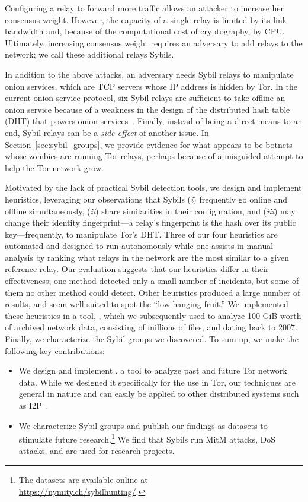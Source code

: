 Configuring a relay to forward more traffic allows an attacker to increase her
consensus weight.  However, the capacity of a single relay is limited by its
link bandwidth and, because of the computational cost of cryptography, by CPU.
Ultimately, increasing consensus weight requires an adversary to add relays to
the network; we call these additional relays Sybils.

In addition to the above attacks, an adversary needs Sybil relays to manipulate
onion services, which are TCP servers whose IP address is hidden by Tor.  In the
current onion service protocol, six Sybil relays are sufficient to take offline
an onion service because of a weakness in the design of the distributed hash
table (DHT) that powers onion services~\cite[\S~V]{Biryukov2013a}.  Finally,
instead of being a direct means to an end, Sybil relays can be a \emph{side
effect} of another issue.  In Section~\ref{sec:sybil_groups}, we provide
evidence for what appears to be botnets whose zombies are running Tor relays,
perhaps because of a misguided attempt to help the Tor network grow.

Motivated by the lack of practical Sybil detection tools, we design and
implement heuristics, leveraging our observations that Sybils (\emph{i})
frequently go online and offline simultaneously, (\emph{ii}) share similarities
in their configuration, and (\emph{iii}) may change their identity
fingerprint---a relay's fingerprint is the hash over its public
key---frequently, to manipulate Tor's DHT.  Three of our four heuristics are
automated and designed to run autonomously while one assists in manual analysis
by ranking what relays in the network are the most similar to a given reference
relay.  Our evaluation suggests that our heuristics differ in their
effectiveness; one method detected only a small number of incidents, but some of
them no other method could detect.  Other heuristics produced a large number of
results, and seem well-suited to spot the ``low hanging fruit.'' We implemented
these heuristics in a tool, \sys, which we subsequently used to analyze 100 GiB
worth of archived network data, consisting of millions of files, and dating back
to 2007.  Finally, we characterize the Sybil groups we discovered.  To sum up,
we make the following key contributions:
\begin{itemize}
	\item We design and implement \sys, a tool to analyze past and future Tor
		network data.  While we designed it specifically for the use in Tor, our
		techniques are general in nature and can easily be applied to other
		distributed systems such as I2P~\cite{i2p}.
	\item We characterize Sybil groups and publish our findings as datasets to
		stimulate future research.\footnote{The datasets are available online
		at\\\url{https://nymity.ch/sybilhunting/}.} We find that Sybils run MitM
		attacks, DoS attacks, and are used for research projects.
\end{itemize}

